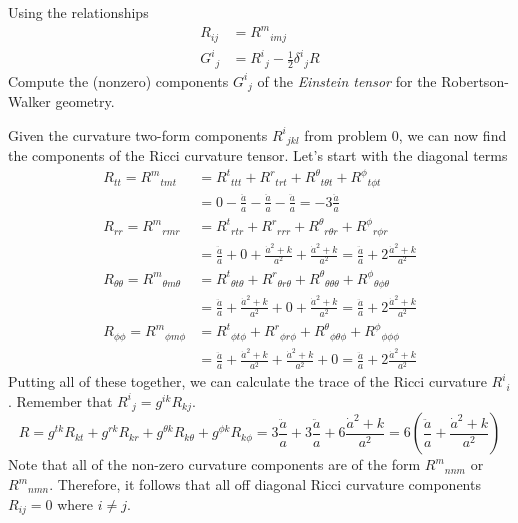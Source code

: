 \documentclass[a4paper, 11pt]{article}
\newenvironment{solution}{%
	\begin{list}{}{%
			\setlength{\topsep}{0pt}%
			\setlength{\leftmargin}{0.5cm}%
			\setlength{\rightmargin}{0.5cm}%
			\setlength{\listparindent}{\parindent}%
			\setlength{\itemindent}{\parindent}%
			\setlength{\parsep}{\parskip}%
		}%
		\item[]}{\end{list}}
\begin{document}
\begin{enumerate}[leftmargin=0em, label=\textbf{\arabic*}.]
  \item Using the relationships
    \begin{align}
      R_{ij} &= R^m{}_{imj} \\
      G^i{}_j &= R^i{}_j-\frac{1}{2}\delta^i{}_jR
    \end{align}
    Compute the (nonzero) components $G^i{}_j$ of the \textit{Einstein tensor}
    for the Robertson-Walker geometry.\\
    \begin{solution}
      Given the curvature two-form components $R^i{}_{jkl}$ from problem 0, we
      can now find the components of the Ricci curvature tensor. Let's start
      with the diagonal terms
      \begin{align}
        R_{tt} = R^m{}_{tmt} &= R^t{}_{ttt}+R^r{}_{trt}+R^\theta{}_{t\theta t}+R^{\phi}{}_{t \phi t} \\
                             &= 0 -\frac{\ddot{a}}{a}-\frac{\ddot{a}}{a}-\frac{\ddot{a}}{a} = -3\frac{\ddot{a}}{a} \\
        R_{rr} = R^m{}_{rmr} &= R^t{}_{rtr}+R^{r}{}_{rrr}+R^\theta{}_{r\theta r}+R^\phi{}_{r\phi r} \\
                             &=  \frac{\ddot{a}}{a} + 0 + \frac{\dot{a}^2+k}{a^2} + \frac{\dot{a}^2+k}{a^2} = \frac{\ddot{a}}{a}+2 \frac{\dot{a}^2+k}{a^2} \\
        R_{\theta\theta} = R^m{}_{\theta m \theta} &= R^t{}_{\theta t \theta} + R^r{}_{\theta r \theta} + R^\theta{}_{\theta\theta\theta} + R^\phi{}_{\theta\phi\theta} \\
                             &= \frac{\ddot{a}}{a} + \frac{\dot{a}^2+k}{a^2} + 0 + \frac{\dot{a}^2+k}{a^2} = \frac{\ddot{a}}{a}+ 2\frac{\dot{a}^2+k}{a^2} \\
        R_{\phi\phi} = R^m{}_{\phi m \phi} &= R^t{}_{\phi t \phi}+R^{r}{}_{\phi r \phi} + R^\theta{}_{\phi \theta \phi} + R^\phi{}_{\phi\phi\phi} \\ 
                             &= \frac{\ddot{a}}{a} + \frac{\dot{a}^2+k}{a^2}+ \frac{\dot{a}^2+k}{a^2}+ 0 = \frac{\ddot{a}}{a}+2\frac{\dot{a}^2+k}{a^2} 
      \end{align}
      Putting all of these together, we can calculate the trace of the Ricci
      curvature $R^i{}_i$. Remember that $R^i{}_j = g^{ik}R_{kj}$.
      \begin{equation}
        R = g^{tk}R_{kt}+g^{rk}R_{kr}+g^{\theta k}R_{k\theta}+g^{\phi k}R_{k\phi} = 3\frac{\ddot{a}}{a}+3\frac{\ddot{a}}{a}+6\frac{\dot{a}^2+k}{a^2} = 6\left( \frac{\ddot{a}}{a}+\frac{\dot{a}^2+k}{a^2} \right)
      \end{equation}
      Note that all of the non-zero curvature components are of the form
      $R^m{}_{nnm}$ or $R^m{}_{nmn}$. Therefore, it follows that all off
      diagonal Ricci curvature components $R_{ij}=0$ where $i\neq j$.


\end{solution}
\end{enumerate}
\end{document}
